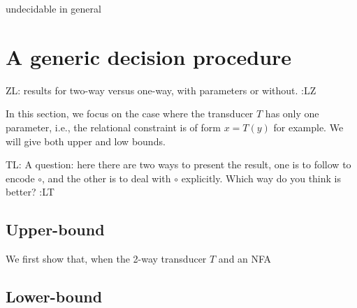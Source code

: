 \documentclass{llncs}
\newcommand{\zhilin}[1]{\color{brown} {ZL: #1 :LZ} \color{black}}
\newcommand{\tl}[1]{\color{blue} {TL: #1 :LT} \color{black}}
\newcommand{\zhilin}[1]{}
\newcommand{\tl}[1]{}
\newcommand{\concat} {\circ}
\begin{document}
{%

\begin{proposition}
undecidable in general
\end{proposition}

\section{A generic decision procedure}

\zhilin{results for two-way versus one-way, with parameters or without.}

In this section, we focus on the case where the transducer $T$ has only one parameter, i.e., the relational constraint is of form $x=T(y)$ for example. We will give both upper and low bounds.

\tl{A question: here there are two ways to present the result, one is to follow \cite{LB16} to encode $\concat$, and the other is to deal with $\concat$ explicitly. Which way do you think is better?}

\subsection{Upper-bound}
We first show that, when the 2-way transducer $T$ and an NFA


\subsection{Lower-bound}




%


%

}
\end{document}
